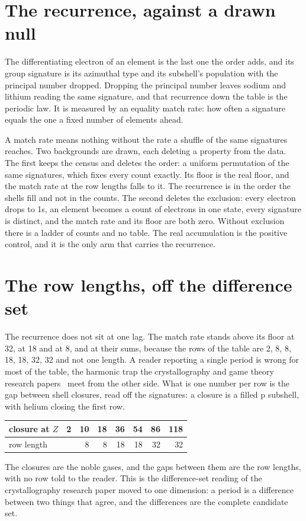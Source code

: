 \section{The recurrence, against a drawn null}

The differentiating electron of an element is the last one the order adds, and its group signature is
its azimuthal type and its subshell's population with the principal number dropped. Dropping the
principal number leaves sodium and lithium reading the same signature, and that recurrence down the
table is the periodic law. It is measured by an equality match rate: how often a signature equals the
one a fixed number of elements ahead.

A match rate means nothing without the rate a shuffle of the same signatures reaches. Two
backgrounds are drawn, each deleting a property from the data. The first keeps the census and deletes
the order: a uniform permutation of the same signatures, which fixes every count exactly. Its floor
is the real floor, and the match rate at the row lengths falls to it. The recurrence is in the order
the shells fill and not in the counts. The second deletes the exclusion: every electron drops to 1s,
an element becomes a count of electrons in one state, every signature is distinct, and the match rate
and its floor are both zero. Without exclusion there is a ladder of counts and no table. The real
accumulation is the positive control, and it is the only arm that carries the recurrence.

\section{The row lengths, off the difference set}

The recurrence does not sit at one lag. The match rate stands above its floor at 32, at 18 and at 8,
and at their sums, because the rows of the table are 2, 8, 8, 18, 18, 32, 32 and not one length. A
reader reporting a single period is wrong for most of the table, the harmonic trap the crystallography
and game theory research papers~\cite{src:Quigg-crystallography,src:Quigg-game-theory} meet from the
other side. What is one number per row is the gap between shell closures, read off the signatures: a
closure is a filled p subshell, with helium closing the first row.

\begin{center}
\begin{tabular}{@{}lrrrrrrr@{}}
\toprule
closure at $Z$ & 2 & 10 & 18 & 36 & 54 & 86 & 118 \\
\midrule
row length     &   & 8  & 8  & 18 & 18 & 32 & 32 \\
\bottomrule
\end{tabular}
\end{center}

\noindent The closures are the noble gases, and the gaps between them are the row lengths, with no
row told to the reader. This is the difference-set reading of the crystallography research paper
moved to one dimension: a period is a difference between two things that agree, and the differences
are the complete candidate set.
